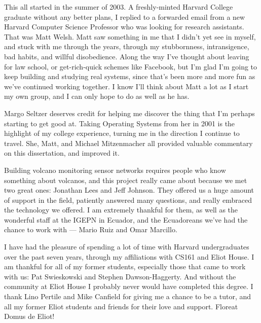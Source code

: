 This all started in the summer of 2003. A freshly-minted Harvard College
graduate without any better plans, I replied to a forwarded email from a new
Harvard Computer Science Professor who was looking for research assistants.
That was Matt Welsh. Matt saw something in me that I didn't yet see in
myself, and stuck with me through the years, through my stubbornness,
intransigence, bad habits, and willful disobedience. Along the way I've
thought about leaving for law school, or get-rich-quick schemes like
Facebook, but I'm glad I'm going to keep building and studying real systems,
since that's been more and more fun as we've continued working together. I
know I'll think about Matt a lot as I start my own group, and I can only hope
to do as well as he has.

Margo Seltzer deserves credit for helping me discover the thing that I'm
perhaps starting to get good at. Taking Operating Systems from her in 2001 is
the highlight of my college experience, turning me in the direction I
continue to travel. She, Matt, and Michael Mitzenmacher all provided valuable
commentary on this dissertation, and improved it.

Building volcano monitoring sensor networks requires people who know
something about volcanos, and this project really came about because we met
two great ones: Jonathan Lees and Jeff Johnson. They offered us a huge amount
of support in the field, patiently answered many questions, and really
embraced the technology we offered. I am extremely thankful for them, as well
as the wonderful staff at the IGEPN in Ecuador, and the Ecuadoreans we've had
the chance to work with --- Mario Ruiz and Omar Marcillo.

I have had the pleasure of spending a lot of time with Harvard undergraduates
over the past seven years, through my affiliations with CS161 and Eliot
House. I am thankful for all of my former students, especially those that
came to work with us: Pat Swieskowski and Stephen Dawson-Haggerty. And
without the community at Eliot House I probably never would have completed
this degree. I thank Lino Pertile and Mike Canfield for giving me a chance to
be a tutor, and all my former Eliot students and friends for their love and
support. Floreat Domus de Eliot!

